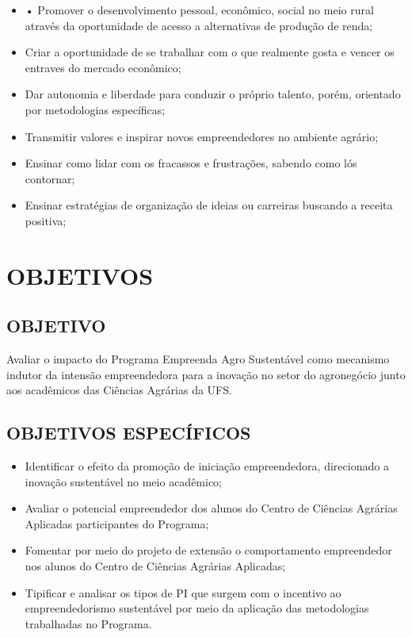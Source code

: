 \begin{itemize}
\item{•	Promover o desenvolvimento pessoal, econômico, social no meio rural através da oportunidade de acesso a alternativas de produção de renda;}
\item{Criar a oportunidade de se trabalhar com o que realmente gosta e vencer os entraves do mercado econômico;}
\item{Dar autonomia e liberdade para conduzir o próprio talento, porém, orientado por metodologias específicas;}
\item{Transmitir valores e inspirar novos empreendedores no ambiente agrário;}
\item{Ensinar como lidar com os fracassos e frustrações, sabendo como lós contornar;}
\item{Ensinar estratégias de organização de ideias ou carreiras buscando a receita positiva;}
\end{itemize}


\section{OBJETIVOS}

\subsection{OBJETIVO}

Avaliar o impacto do Programa Empreenda Agro Sustentável como mecanismo indutor da intensão empreendedora para a inovação no setor do agronegócio junto aos acadêmicos das Ciências Agrárias da UFS.



\subsection{OBJETIVOS ESPECÍFICOS}

\begin{itemize}
\item{Identificar o efeito da promoção de iniciação empreendedora, direcionado a inovação sustentável no meio acadêmico;}
\item {Avaliar o potencial empreendedor dos alunos do Centro de Ciências Agrárias Aplicadas participantes do Programa;
}
\item {Fomentar por meio do projeto de extensão o comportamento empreendedor nos alunos do Centro de Ciências Agrárias Aplicadas;}

\item {Tipificar e analisar os tipos de PI que surgem com o incentivo ao empreendedorismo sustentável por meio da aplicação das metodologias trabalhadas no Programa.}

\end{itemize}


